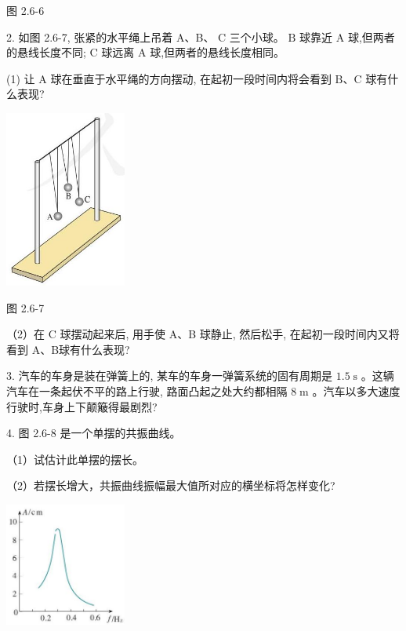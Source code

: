 \documentclass[10pt]{article}
\begin{document}
图 2.6-6

2. 如图 2.6-7, 张紧的水平绳上吊着 A、B、 \(\mathrm{C}\) 三个小球。 \(\mathrm{B}\) 球靠近 \(\mathrm{A}\) 球,但两者的悬线长度不同; \(\mathrm{C}\) 球远离 \(\mathrm{A}\) 球,但两者的悬线长度相同。

(1) 让 \(\mathrm{A}\) 球在垂直于水平绳的方向摆动, 在起初一段时间内将会看到 \(\mathrm{B}\text{、}\mathrm{C}\) 球有什么表现?

\begin{center}
\includegraphics[max width=0.3\textwidth]{images/01910e4c-ebb8-7d2c-8f2f-2375bc1d2d12_63_928403.jpg}
\end{center}

图 2.6-7

（2）在 C 球摆动起来后, 用手使 A、B 球静止, 然后松手, 在起初一段时间内又将看到 A、B球有什么表现?

3. 汽车的车身是装在弹簧上的, 某车的车身一弹簧系统的固有周期是 \({1.5}\mathrm{\;s}\) 。这辆汽车在一条起伏不平的路上行驶, 路面凸起之处大约都相隔 \(8\mathrm{\;m}\) 。汽车以多大速度行驶时,车身上下颠簸得最剧烈?

4. 图 2.6-8 是一个单摆的共振曲线。

（1）试估计此单摆的摆长。

（2）若摆长增大，共振曲线振幅最大值所对应的横坐标将怎样变化?

\begin{center}
\includegraphics[max width=0.3\textwidth]{images/01910e4c-ebb8-7d2c-8f2f-2375bc1d2d12_63_874543.jpg}
\end{center}
\end{document}
